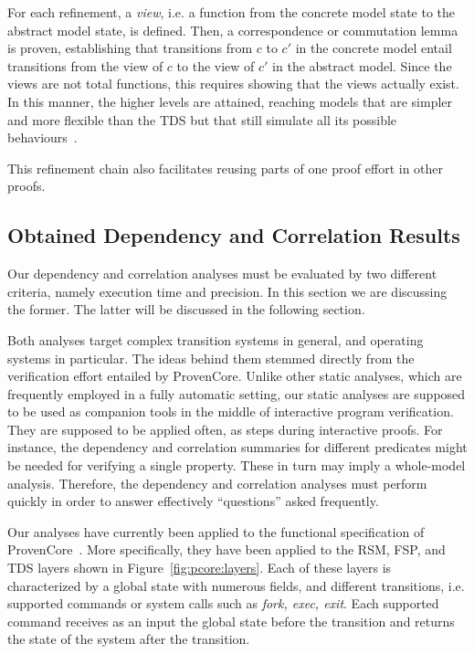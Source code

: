 \documentclass[11pt]{article}
\def\pcore{\textsf{ProvenCore}}
\begin{document}
For each refinement, a \emph{view}, i.e. a function from the concrete model
state to the abstract model state, is defined. Then, a correspondence or
commutation lemma is proven, establishing that transitions from $c$ to $c'$
in the concrete model entail transitions from the view of $c$ to the view of
$c'$ in the abstract model. Since the views are not total functions, this
requires showing that the views actually exist. In this manner, the higher
levels are attained, reaching models that are simpler and more flexible than
the TDS but that still simulate all its possible
behaviours~\cite{lescuyer15}.

This refinement chain also facilitates reusing parts of one proof effort in 
other proofs.

\subsection{Obtained Dependency and Correlation Results}\label{ch9:tstats} 

Our dependency and correlation analyses must be evaluated by two different
criteria, namely execution time and precision. In this section we are discussing the
former. The latter will be discussed in the following section.

Both analyses target complex transition systems in general, and operating systems
in particular. The ideas behind them stemmed directly from the verification effort
entailed by {\pcore}. Unlike other static analyses, which are frequently employed 
in a fully automatic setting, our static analyses are supposed to be used as 
companion tools in the middle of interactive program verification. They are supposed
to be applied often, as steps during interactive proofs. For instance, the dependency
and correlation summaries for different predicates might be needed for verifying a 
single property. These in turn may imply a whole-model analysis. Therefore, the 
dependency and correlation analyses must perform quickly in order to answer effectively
``questions'' asked frequently. 

Our analyses have currently been applied to the functional specification of
{\pcore}~\cite{lescuyer15}. More specifically, they have been
applied to the RSM, FSP, and TDS layers shown in
Figure~\ref{fig:pcore:layers}. Each of these layers is characterized by a global
state with numerous fields, and different transitions, i.e. supported commands
or system calls such as \emph{fork, exec, exit}. Each supported command receives
as an input the global state before the transition and returns the state of the
system after the transition.
\end{document}
